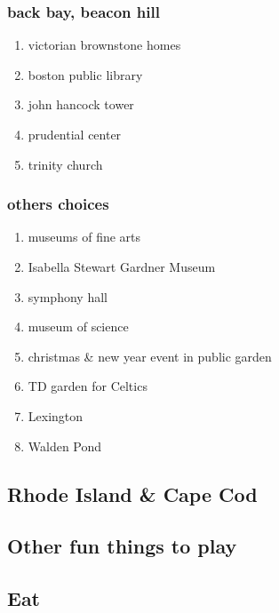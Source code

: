 \documentclass[11pt]{article}
\begin{document}
\subsubsection{back bay, beacon hill}
\label{sec:orgheadline22}

\begin{enumerate}
\item victorian brownstone homes
\label{sec:orgheadline17}
\item boston public library
\label{sec:orgheadline18}

\item john hancock tower
\label{sec:orgheadline19}

\item prudential center
\label{sec:orgheadline20}

\item trinity church
\label{sec:orgheadline21}
\end{enumerate}

\subsubsection{others choices}
\label{sec:orgheadline31}

\begin{enumerate}
\item museums of fine arts
\label{sec:orgheadline23}

\item Isabella Stewart Gardner Museum
\label{sec:orgheadline24}

\item symphony hall
\label{sec:orgheadline25}

\item museum of science
\label{sec:orgheadline26}

\item christmas \& new year event in public garden
\label{sec:orgheadline27}

\item TD garden for Celtics
\label{sec:orgheadline28}
\item Lexington
\label{sec:orgheadline29}

\item Walden Pond
\label{sec:orgheadline30}
\end{enumerate}

\subsection{Rhode Island \& Cape Cod}
\label{sec:orgheadline33}

\subsection{Other fun things to play}
\label{sec:orgheadline34}

\subsection{Eat}
\label{sec:orgheadline35}
\end{document}
